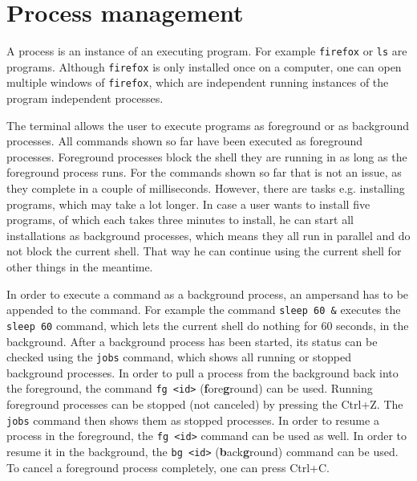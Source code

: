 \section{Process management}

A process is an instance of an executing program. For example \lstinline{firefox} or \lstinline{ls} are programs. Although \lstinline{firefox} is only installed once on a computer, one can open multiple windows of \lstinline{firefox}, which are independent running instances of the program \textendash{} independent processes.

The terminal allows the user to execute programs as foreground or as background processes. All commands shown so far have been executed as foreground processes. Foreground processes block the shell they are running in as long as the foreground process runs. For the commands shown so far that is not an issue, as they complete in a couple of milliseconds. However, there are tasks e.g. installing programs, which may take a lot longer. In case a user wants to install five programs, of which each takes three minutes to install, he can start all installations as background processes, which means they all run in parallel and do not block the current shell. That way he can continue using the current shell for other things in the meantime.

In order to execute a command as a background process, an ampersand has to be appended to the command. For example the command \lstinline{sleep 60 &} executes the \lstinline{sleep 60} command, which lets the current shell do nothing for 60 seconds, in the background. After a background process has been started, its status can be checked using the \lstinline{jobs} command, which shows all running or stopped background processes. In order to pull a process from the background back into the foreground, the command \lstinline{fg <id>} (\textbf{f}ore\textbf{g}round) can be used. Running foreground processes can be stopped (not canceled) by pressing the Ctrl+Z. The \lstinline{jobs} command then shows them as stopped processes. In order to resume a process in the foreground, the \lstinline{fg <id>} command can be used as well. In order to resume it in the background, the \lstinline{bg <id>} (\textbf{b}ack\textbf{g}round) command can be used. To cancel a foreground process completely, one can press Ctrl+C.